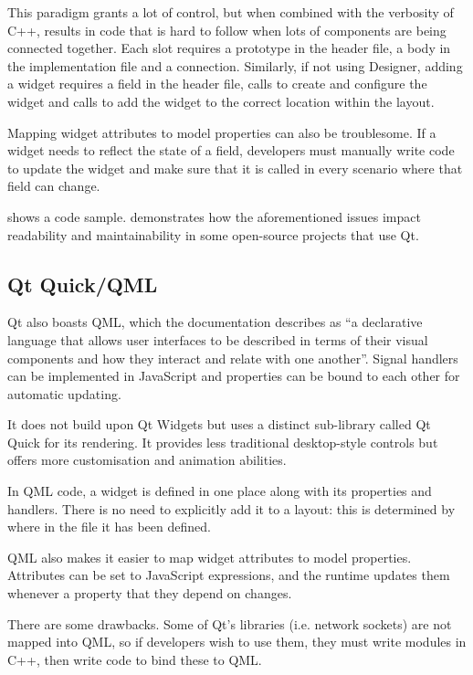 \documentclass[11pt]{report}
\begin{document}
This paradigm grants a lot of control, but when combined with the verbosity of C++, results in code that is hard to follow when lots of components are being connected together. Each slot requires a prototype in the header file, a body in the implementation file and a connection. Similarly, if not using Designer, adding a widget requires a field in the header file, calls to create and configure the widget and calls to add the widget to the correct location within the layout.

Mapping widget attributes to model properties can also be troublesome. If a widget needs to reflect the state of a field, developers must manually write code to update the widget and make sure that it is called in every scenario where that field can change.

 shows a code sample.  demonstrates how the aforementioned issues impact readability and maintainability in some open-source projects that use Qt.

\subsection{Qt Quick/QML} \label{secQML}

Qt also boasts QML, which the documentation describes as ``a declarative language that allows user interfaces to be described in terms of their visual components and how they interact and relate with one another''\cite{QML}. Signal handlers can be implemented in JavaScript and properties can be bound to each other for automatic updating.

It does not build upon Qt Widgets but uses a distinct sub-library called Qt Quick for its rendering. It provides less traditional desktop-style controls but offers more customisation and animation abilities.

In QML code, a widget is defined in one place along with its properties and handlers. There is no need to explicitly add it to a layout: this is determined by where in the file it has been defined.

QML also makes it easier to map widget attributes to model properties. Attributes can be set to JavaScript expressions, and the runtime updates them whenever a property that they depend on changes.

There are some drawbacks. Some of Qt's libraries (i.e. network sockets) are not mapped into QML, so if developers wish to use them, they must write modules in C++, then write code to bind these to QML.
\end{document}
